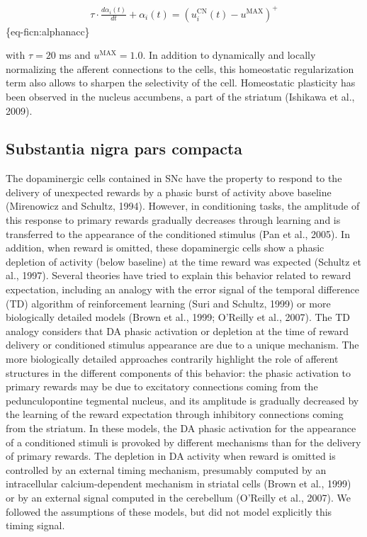 \documentclass[
  11pt,
  a4paper,
]{scrbook}
\begin{document}
\[
\begin{aligned}
    \tau \cdot \frac{d \alpha_{i}(t)}{d t} + \alpha_i(t) = (u^{\text{CN}}_i(t) - u^\text{MAX} )^+
\end{aligned}
\] \{eq-ficn:alphanacc\}

with \(\tau = 20\) ms and \(u^\text{MAX} = 1.0\). In addition to
dynamically and locally normalizing the afferent connections to the
cells, this homeostatic regularization term also allows to sharpen the
selectivity of the cell. Homeostatic plasticity has been observed in the
nucleus accumbens, a part of the striatum (Ishikawa et al., 2009).

\subsection{Substantia nigra pars
compacta}\label{substantia-nigra-pars-compacta}

The dopaminergic cells contained in SNc have the property to respond to
the delivery of unexpected rewards by a phasic burst of activity above
baseline (Mirenowicz and Schultz, 1994). However, in conditioning tasks,
the amplitude of this response to primary rewards gradually decreases
through learning and is transferred to the appearance of the conditioned
stimulus (Pan et al., 2005). In addition, when reward is omitted, these
dopaminergic cells show a phasic depletion of activity (below baseline)
at the time reward was expected (Schultz et al., 1997). Several theories
have tried to explain this behavior related to reward expectation,
including an analogy with the error signal of the temporal difference
(TD) algorithm of reinforcement learning (Suri and Schultz, 1999) or
more biologically detailed models (Brown et al., 1999; O'Reilly et al.,
2007). The TD analogy considers that DA phasic activation or depletion
at the time of reward delivery or conditioned stimulus appearance are
due to a unique mechanism. The more biologically detailed approaches
contrarily highlight the role of afferent structures in the different
components of this behavior: the phasic activation to primary rewards
may be due to excitatory connections coming from the pedunculopontine
tegmental nucleus, and its amplitude is gradually decreased by the
learning of the reward expectation through inhibitory connections coming
from the striatum. In these models, the DA phasic activation for the
appearance of a conditioned stimuli is provoked by different mechanisms
than for the delivery of primary rewards. The depletion in DA activity
when reward is omitted is controlled by an external timing mechanism,
presumably computed by an intracellular calcium-dependent mechanism in
striatal cells (Brown et al., 1999) or by an external signal computed in
the cerebellum (O'Reilly et al., 2007). We followed the assumptions of
these models, but did not model explicitly this timing signal.
\end{document}
